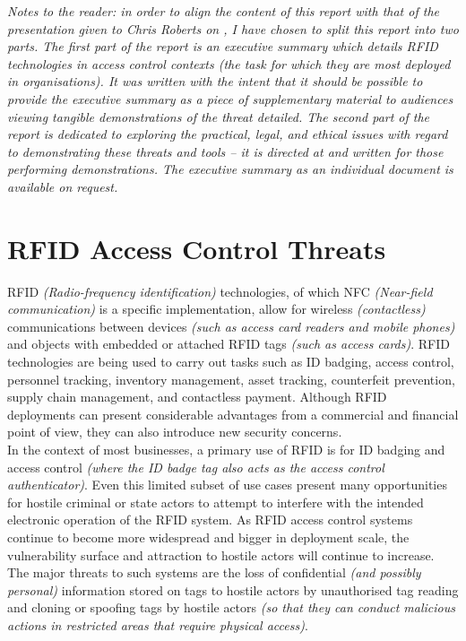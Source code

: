 \textit{Notes to the reader: in order to align the content of this report with that of the presentation given to Chris Roberts on , I have chosen to split this report into two parts. The first part of the report is an executive summary which details RFID technologies in access control contexts (the task for which they are most deployed in organisations). It was written with the intent that it should be possible to provide the executive summary as a piece of supplementary material to audiences viewing tangible demonstrations of the threat detailed. The second part of the report is dedicated to exploring the practical, legal, and ethical issues with regard to demonstrating these threats and tools -- it is directed at and written for those performing demonstrations. The executive summary as an individual document is available on request.}

\section{RFID Access Control Threats}
RFID \textit{(Radio-frequency identification)} technologies, of which NFC \textit{(Near-field communication)} is a specific implementation, allow for wireless \textit{(contactless)} communications between devices \textit{(such as access card readers and mobile phones)} and objects with embedded or attached RFID tags \textit{(such as access cards)}. RFID technologies are being used to carry out tasks such as ID badging, access control, personnel tracking, inventory management, asset tracking, counterfeit prevention, supply chain management, and contactless payment. Although RFID deployments can present considerable advantages from a commercial and financial point of view, they can also introduce new security concerns.\\

\noindent In the context of most businesses, a primary use of RFID is for ID badging and access control \textit{(where the ID badge tag also acts as the access control authenticator)}. Even this limited subset of use cases present many opportunities for hostile criminal or state actors to attempt to interfere with the intended electronic operation of the RFID system. As RFID access control systems continue to become more widespread and bigger in deployment scale, the vulnerability surface and attraction to hostile actors will continue to increase.\\

\noindent The major threats to such systems are the loss of confidential \textit{(and possibly personal)} information stored on tags to hostile actors by unauthorised tag reading and cloning or spoofing tags by hostile actors \textit{(so that they can conduct malicious actions in restricted areas that require physical access)}.\\

